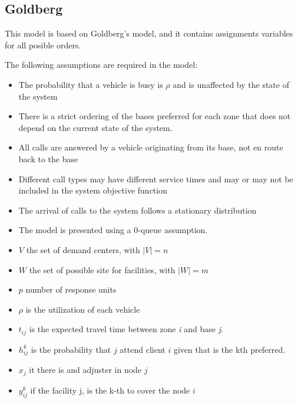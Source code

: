 
\subsection{Goldberg}

\begin{frame}
  This model is based on Goldberg's model, and it contains assignments
  variables for all posible orders.

  The following assumptions are required in the model:
  \begin{itemize}
  \item The probability that a vehicle is busy is $\rho$
    and is unaffected by the state of the system
  \item There is a strict ordering of the bases preferred for each zone
    that does not depend on the current state of the system. 
  \item All calls are answered by a vehicle originating from its base,
    not en route back to the base
  \item Different call types may have different service times
    and may or may not be included in the system objective function
  \item The arrival of calls to the system follows a stationary distribution
  \item The model is presented using a 0-queue assumption.
  \end{itemize}
  
\end{frame}


\begin{frame}
  \begin{itemize}
  \item $V$ the set of demand centers, with $|V| = n$
  \item $W$ the set of possible site for facilities, with $|W| = m$
  \item $p$ number of response units
  \item $\rho$ is the utilization of each vehicle
  \item $t_{ij}$ is the expected travel time between zone \textit{i} and base \textit{j}.
  \item $h_{ij}^{k}$ is the probability that $j$ attend client $i$ given that
    is the kth preferred.
  \item $x_j$ it there is and adjuster in node $j$
  \item $y_{ij}^k$ if the facility j, is the k-th to cover the node $i$
  \end{itemize}
\end{frame}

